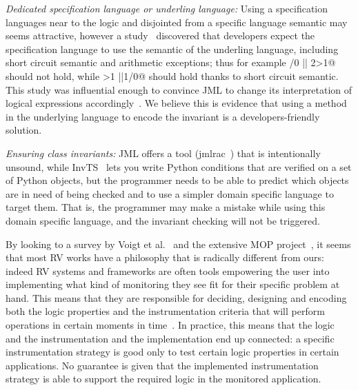 \noindent\textit{Dedicated specification language or underling language:}
Using a specification languages near to the logic and disjointed from a specific language
semantic may seems attractive, however
a study~\cite{chalin2007logical} discovered that developers expect
the specification language to use the semantic of the underling language, including
short circuit semantic and arithmetic exceptions; thus for example
/0 || 2>1@
should not hold, while 
>1 ||1/0@ should hold thanks to short circuit semantic.
This study was influential enough to convince JML to change its interpretation of logical expressions
accordingly~\cite{chalin2008jml}.
We believe this is evidence that using a method in the underlying language to encode the invariant is
a developers-friendly solution.



\noindent\textit{Ensuring class invariants:}
JML offers a tool (jmlrac~\cite{Burdy2005}) that is intentionally unsound,
while InvTS~\cite{gorbovitski08efficient} lets you write Python conditions
 that are verified on a set of Python objects, but the programmer needs to be able
 to predict which objects are in need of being checked and to use a simpler domain
 specific language to target them. That is, the programmer may make a mistake
while using this domain specific language, and the invariant checking
will not be triggered.

By looking to a survey by Voigt et al.~\cite{Voigt2013} and the extensive MOP project~\cite{meredith2012overview},
it seems that most RV works have a philosophy that is radically different from ours:
indeed RV systems and frameworks are often tools empowering the user
into implementing what kind of monitoring they see fit for their specific problem at hand.
This means that they are responsible for deciding, designing and encoding both the 
logic properties and the instrumentation criteria that will perform operations
in certain moments in time~\cite{meredith2012overview}.
In practice, this means that the logic and the instrumentation and the implementation end up connected:
a specific instrumentation strategy is good only to test certain logic properties in certain applications.
No guarantee is given that the implemented instrumentation strategy is able to support
the required logic in the monitored application.

